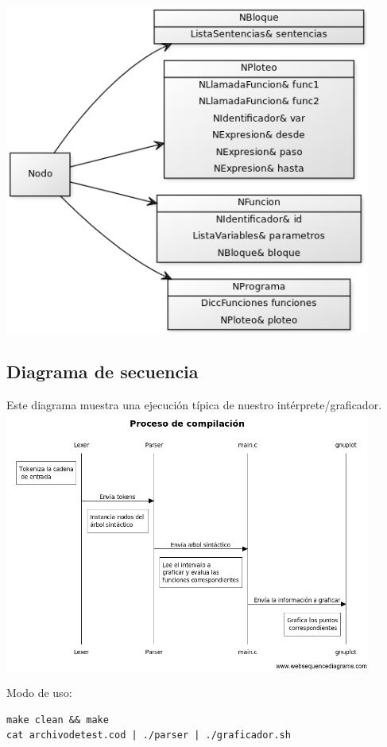 \includegraphics[width=0.9\textwidth,height=0.9\textheight,keepaspectratio]{imgs/clases4.png}
\newpage
\subsection{Diagrama de secuencia}
Este diagrama muestra una ejecución típica de nuestro intérprete/graficador.\\
\includegraphics[width=0.9\textwidth,height=0.9\textheight,keepaspectratio]{imgs/secuencia.png}

Modo de uso:
\begin{verbatim}
make clean && make
cat archivodetest.cod | ./parser | ./graficador.sh 
\end{verbatim} 